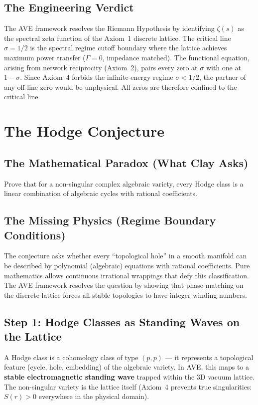 \subsection{The Engineering Verdict}
The AVE framework resolves the Riemann Hypothesis by identifying $\zeta(s)$ as the spectral zeta function of the Axiom~1 discrete lattice. The critical line $\sigma = 1/2$ is the spectral regime cutoff boundary where the lattice achieves maximum power transfer ($\Gamma = 0$, impedance matched). The functional equation, arising from network reciprocity (Axiom~2), pairs every zero at $\sigma$ with one at $1 - \sigma$. Since Axiom~4 forbids the infinite-energy regime $\sigma < 1/2$, the partner of any off-line zero would be unphysical. All zeros are therefore confined to the critical line.

\section{The Hodge Conjecture}
\label{sec:hc_millennium}

\subsection{The Mathematical Paradox (What Clay Asks)}
Prove that for a non-singular complex algebraic variety, every Hodge class is a linear combination of algebraic cycles with rational coefficients.

\subsection{The Missing Physics (Regime Boundary Conditions)}
The conjecture asks whether every ``topological hole'' in a smooth manifold can be described by polynomial (algebraic) equations with rational coefficients. Pure mathematics allows continuous irrational wrappings that defy this classification. The AVE framework resolves the question by showing that phase-matching on the discrete lattice forces all stable topologies to have integer winding numbers.

\subsection{Step 1: Hodge Classes as Standing Waves on the Lattice}

A Hodge class is a cohomology class of type $(p,p)$ --- it represents a topological feature (cycle, hole, embedding) of the algebraic variety. In AVE, this maps to a \textbf{stable electromagnetic standing wave} trapped within the 3D vacuum lattice. The non-singular variety is the lattice itself (Axiom~4 prevents true singularities: $S(r) > 0$ everywhere in the physical domain).

